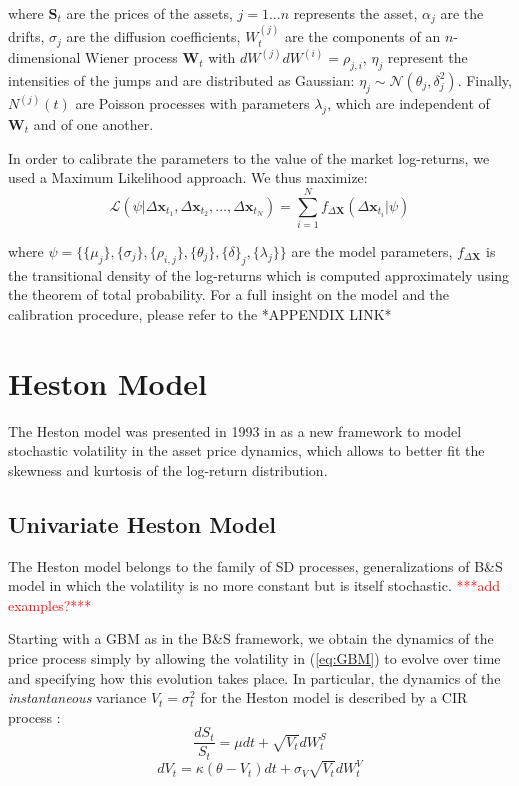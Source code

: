 where $\mathbf{S}_t$ are the prices of the assets, $j = 1 ... n$ represents the asset, $\alpha_j$ are the drifts, $\sigma_j$ are the diffusion coefficients, $W^{(j)}_t$ are the components of an $n$-dimensional Wiener process $ \mathbf{W}_t$ with $dW^{(j)}dW^{(i)}=\rho_{j,i}$, $\eta_j$ represent the intensities of the jumps and are distributed as Gaussian: $\eta_j \sim \mathcal{N}(\theta_j , \delta_j^2)$. Finally, $N^{(j)}(t)$ are Poisson processes with parameters $\lambda_j$, which are independent of $\mathbf{W}_t$ and of one another. 

In order to calibrate the parameters to the value of the market log-returns, we used a Maximum Likelihood approach. We thus maximize:
\begin{equation}
\mathcal{L}(\psi | \Delta \mathbf{x}_{t_1},\Delta \mathbf{x}_{t_2},\dots,\Delta \mathbf{x}_{t_N}) = \sum_{i=1}^{N} f_{\Delta \mathbf{X}}(\Delta\mathbf{x}_{t_i} | \psi)
\end{equation}

where $\psi = \{ \{\mu_j\},\{\sigma_j\},\{\rho_{i,j}\},\{\theta_j\},\{\delta\}_j,\{\lambda_j\} \}$ are the model parameters, $f_{\Delta \mathbf{X}}$ is the transitional density of the log-returns which is computed approximately using the theorem of total probability.
For a full insight on the model and the calibration procedure, please refer to the *APPENDIX LINK*

\bigskip

\section{Heston Model}

The Heston model was presented in 1993 in \cite{HESTON93} as a new framework to model stochastic volatility in the asset price dynamics, which allows to better fit the skewness and kurtosis of the log-return distribution.

\subsection{Univariate Heston Model}
The Heston model belongs to the family of SD processes, generalizations of B\&S model in which the volatility is no more constant but is itself  stochastic.
\textcolor{red}{***add examples?***}

Starting with a GBM as in the B\&S framework, we obtain the dynamics of the price process simply by allowing the volatility in (\ref{eq:GBM}) to evolve over time and specifying how this evolution takes place.
In particular, the dynamics of the \textit{instantaneous} variance $V_t = \sigma_t^2$ for the Heston model is described by a CIR process :
\begin{equation}
\label{eq:heston_price}
	\frac{dS_t}{S_t} = \mu dt +\sqrt{ V_t} dW_t^S
\end{equation}
\begin{equation}
\label{eq:heston_variance}
	dV_t = \kappa (\theta - V_t) dt + \sigma_V \sqrt{V_t} dW_t^V
\end{equation}

